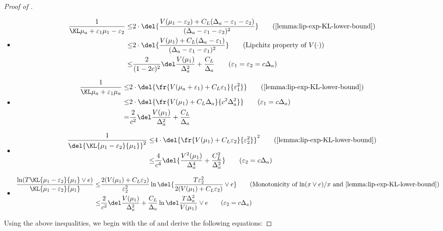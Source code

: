 \begin{proof}[Proof of ]
\begin{itemize}
    \item
    \begin{align}
        \GoodEventBound
        \leq&
        2 \cdot\del{
            \frac{V(\mu_1-\varepsilon_2)+C_L(\Delta_a-\varepsilon_1-\varepsilon_2)}
            {(\Delta_a - \varepsilon_1 - \varepsilon_2)^2}
            }
                \tag{\Cref{lemma:lip-exp-KL-lower-bound}}
        \\
        \leq&
        2 \cdot\del{
            \frac{V(\mu_1)+C_L(\Delta_a-\varepsilon_1)}
            {(\Delta_a - \varepsilon_1 - \varepsilon_1)^2}
        }
                \tag{Lipchitz property of $V(\cdot)$}
        \\
        \leq&
        \frac{2}{(1-2c)^2}\CommonFactorInRegretBound
                \tag{$\varepsilon_1 = \varepsilon_2 = c\Delta_a$}
    \end{align} 
    \item 
    \begin{align*}
        \ExpFTwo
        \leq&
        2 \cdot\del{\fr {V(\mu_a+\varepsilon_1)+C_L\varepsilon_1}{\varepsilon_1^2}}
                \tag{\Cref{lemma:lip-exp-KL-lower-bound}}
        \\
        \leq&
        2 \cdot\del{\fr {V(\mu_1)+C_L\Delta_a}{c^2 \Delta_a^2}}
                \tag{$\varepsilon_1 =  c\Delta_a$}
        \\
        =&
        \frac{2}{c^2} \CommonFactorInRegretBound
    \end{align*}
    \item 
    \begin{align*}
        \frac{1}{\del{\KL{\mu_1-\varepsilon_2}{\mu_1}}^2}
        \leq&
        4 \cdot\del{ \fr {V(\mu_1) + C_L \varepsilon_2}{\varepsilon_2^2} }^2
                \tag{\Cref{lemma:lip-exp-KL-lower-bound}}
        \\
        \leq&
        \frac{4}{c^4} \del{\frac{V^2(\mu_1)}{\Delta_a^4} + \frac{C_L^2}{\Delta_a^2}}
                \tag{$\varepsilon_2 =  c\Delta_a$}
    \end{align*}
    \item
    \begin{align*}
        \frac{\ln(T\KL{\mu_1-\varepsilon_2}{\mu_1} \vee e)}{\KL{\mu_1-\varepsilon_2}{\mu_1}}
        \leq&
        \frac{2(V(\mu_1) + C_L\varepsilon_2)}{\varepsilon_2^2} \ln\del{\frac{T\varepsilon_2^2}{2(V(\mu_1)+C_L\varepsilon_2)} \vee e}
                \tag{Monotonicity of $\ln(x \vee e)/x$ and \Cref{lemma:lip-exp-KL-lower-bound}}
        \\
        \leq&
        \frac{2}{c^2} \CommonFactorInRegretBound \LogFactorInRegretBound
                \tag{$\varepsilon_2 =  c\Delta_a$}
    \end{align*}
    \end{itemize}
    Using the above inequalities, we begin with the  of  and derive the following equations:


\end{proof}
